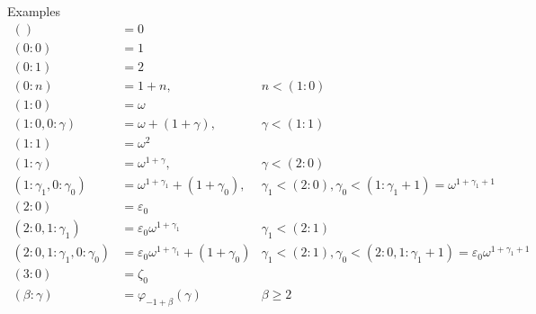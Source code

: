 \documentclass{article}
\newcommand{\w}{\omega}
\newcommand{\e}{\varepsilon}
\begin{document}


Examples \\
\begin{align*}
  () &= 0 \\
  (0: 0) &= 1 \\
  (0: 1) &= 2 \\
  (0: n) &= 1+n, & n < (1: 0) \\
  (1: 0) &= \w \\
  (1: 0, 0: \gamma) &= \w+(1+\gamma), & \gamma < (1: 1) \\
  (1: 1) &= \w^2 \\
  (1: \gamma) &= \w^{1+\gamma}, & \gamma < (2: 0) \\
  (1: \gamma_1, 0: \gamma_0) &= \w^{1+\gamma_1}+(1+\gamma_0),
  & \gamma_1 < (2: 0), \gamma_0 < (1: \gamma_1+1) = \w^{1+\gamma_1+1} \\
  (2: 0) &= \e_0 \\
  (2: 0, 1: \gamma_1) &= \e_0\w^{1+\gamma_1}
  & \gamma_1 < (2: 1) \\
  (2: 0, 1: \gamma_1, 0: \gamma_0) &= \e_0\w^{1+\gamma_1}+(1+\gamma_0)
  & \gamma_1 < (2: 1), \gamma_0 < (2: 0, 1: \gamma_1+1) = \e_0\w^{1+\gamma_1+1} \\
  (3: 0) &= \zeta_0 \\
  (\beta: \gamma) &= \varphi_{-1+\beta}(\gamma) & \beta \geq 2
\end{align*} \\
\end{document}
